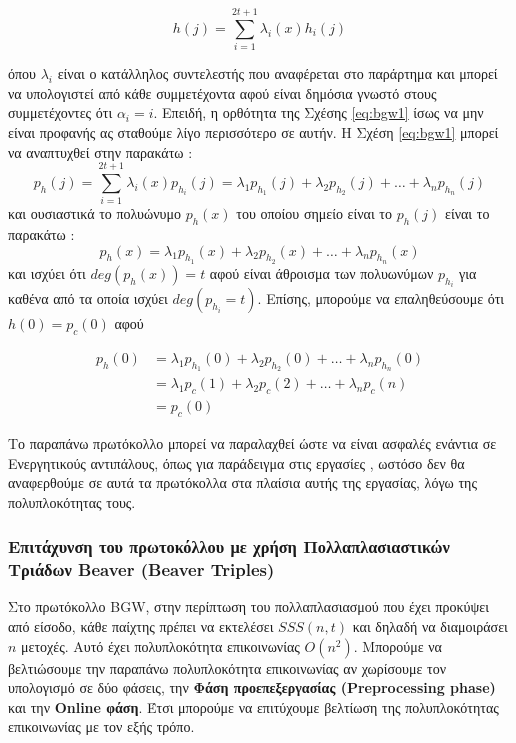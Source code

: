 \begin{itemize}
\begin{itemize}
            \begin{equation}\label{eq:bgw1}
            h(j) = \sum_{i=1}^{2t+1}λ_i(x)h_i(j)
            \end{equation}
            
            όπου $λ_i$ είναι ο κατάλληλος συντελεστής που αναφέρεται στο παράρτημα  και μπορεί να υπολογιστεί από κάθε συμμετέχοντα αφού είναι δημόσια γνωστό στους συμμετέχοντες ότι $α_i=i$. Επειδή, η ορθότητα της Σχέσης \ref{eq:bgw1} ίσως να μην είναι προφανής ας σταθούμε λίγο περισσότερο σε αυτήν. Η Σχέση \ref{eq:bgw1} μπορεί να αναπτυχθεί στην παρακάτω :
            $$            
                 p_h(j) = \sum_{i=1}^{2t+1}λ_i(x)p_{h_i}(j) = λ_1p_{h_1}(j) + λ_2p_{h_2}(j) + \ldots + λ_n p_{h_n}(j)
            $$
            και ουσιαστικά το πολυώνυμο $p_h(x)$ του οποίου σημείο είναι το $p_h(j)$ είναι το παρακάτω : 
            $$
                p_h(x) = λ_1p_{h_1}(x) + λ_2p_{h_2}(x) + \ldots + λ_n p_{h_n}(x)
            $$
            και ισχύει ότι $deg(p_h(x))=t$ αφού είναι άθροισμα των πολυωνύμων $p_{h_i}$ για καθένα από τα οποία ισχύει $deg(p_{h_i} = t)$. Επίσης, μπορούμε να επαληθεύσουμε ότι $h(0)=p_c(0)$ αφού
            
            \begin{align}
                p_h(0) &= λ_1 p_{h_1}(0) + λ_2 p_{h_2}(0) + \ldots + λ_n p_{h_n}(0) \\
                &= λ_1 p_c(1) + λ_2 p_c(2) + \ldots + λ_n p_c(n) \\
                &= p_c(0)
            \end{align}

        \end{itemize}
\end{itemize}

Το παραπάνω πρωτόκολλο μπορεί να παραλαχθεί ώστε να είναι ασφαλές ενάντια σε Ενεργητικούς αντιπάλους, όπως για παράδειγμα στις εργασίες , ωστόσο δεν θα αναφερθούμε σε αυτά τα πρωτόκολλα στα πλαίσια αυτής της εργασίας, λόγω της πολυπλοκότητας τους.

\subsubsection{Επιτάχυνση του πρωτοκόλλου με χρήση Πολλαπλασιαστικών Τριάδων Beaver (Beaver Triples)}
Στο πρωτόκολλο BGW, στην περίπτωση του πολλαπλασιασμού που έχει προκύψει από είσοδο, κάθε παίχτης πρέπει να εκτελέσει $SSS(n,t)$ και δηλαδή να διαμοιράσει $n$ μετοχές. Αυτό έχει πολυπλοκότητα επικοινωνίας $O(n^2)$. Μπορούμε να βελτιώσουμε την παραπάνω πολυπλοκότητα επικοινωνίας αν χωρίσουμε τον υπολογισμό σε δύο φάσεις, την \textbf{Φάση προεπεξεργασίας (Preprocessing phase)} και την \textbf{Online φάση}. Έτσι μπορούμε να επιτύχουμε βελτίωση της πολυπλοκότητας επικοινωνίας με τον εξής τρόπο.

